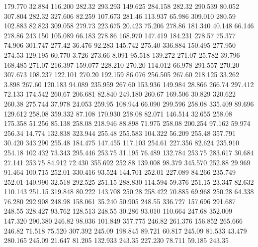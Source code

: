  179.770   32.884  116.200       282.32
 293.293  149.625  284.158       282.32
 290.539   80.052  307.804       282.32
 327.606   82.259  107.673       281.46
 113.937   65.986  309.010       280.59
 102.883   82.823  309.058       279.73
 223.675   20.423   75.206       278.86
 181.340   40.148   66.146       278.86
 243.150  105.089   66.183       278.86
 168.970  147.419  184.231       278.57
  75.377   74.906  301.747       277.42
  36.476   92.283  145.742       275.40
 336.884  150.495  277.950       274.53
 129.195   60.770    3.726       273.66
   8.091   95.518  139.272       271.07
  25.782   39.796  168.485       271.07
 216.397  159.077  228.210       270.20
 114.012   66.978  291.557       270.20
 307.673  108.237  122.101       270.20
 192.159   86.076  256.505       267.60
 218.125   33.262    3.898       267.60
 120.183   94.089  235.959       267.60
 153.936  149.984   28.866       266.74
 297.412   72.133  174.542       260.67
 206.681   82.840  249.180       260.67
 169.506   30.829  320.622       260.38
 275.744   37.978   24.053       259.95
 108.944   66.090  299.596       258.08
 335.409   89.696  129.612       258.08
 359.332   87.108  170.930       258.08
  82.071  146.514   32.655       258.08
 175.358   51.256   85.138       258.08
 218.946   88.898   71.975       258.08
 200.254   97.162   59.974       256.34
  14.774  132.838  323.944       255.48
 255.583  104.322   56.209       255.48
 357.791   30.420  343.290       255.48
 184.475  147.455  117.103       254.61
 227.356   82.624  235.910       254.18
 102.432   73.343  295.446       253.75
  31.195   76.489  132.784       253.75
 283.617   30.684   27.141       253.75
  84.912   72.430  355.692       252.88
 139.008   98.379  345.570       252.88
  29.969   91.464  100.715       252.01
 330.416   93.524  144.701       252.01
 227.089   84.266  235.749       252.01
 140.990   32.518  292.525       251.15
 288.830  114.594   59.376       251.15
  23.347   82.632  110.143       251.15
 319.848   80.222  143.708       250.28
 258.422   70.885   69.968       250.28
  64.338   76.280  292.908       248.98
 158.061   35.240   50.905       248.55
 336.727  157.696  291.687       248.55
 328.427   93.762  128.513       248.55
  30.286   93.010  110.664       247.68
 352.009  147.320  290.380       246.82
  98.036  101.849  357.775       246.82
 261.376  156.852  265.666       246.82
  71.518   75.520  307.392       245.09
 198.845   89.721   60.817       245.09
  81.533   43.479  280.165       245.09
  21.647   81.205  132.933       243.35
 227.230   78.711   59.185       243.35
